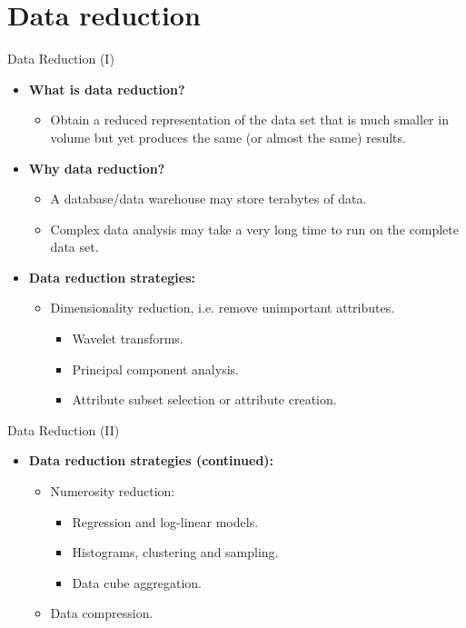 \section{Data reduction}

\begin{frame}{Data Reduction (I)}
	\begin{itemize}
		\item \textbf{What is data reduction?}\\
		      \begin{itemize}
			      \item Obtain a reduced representation of the data set that is much
			            smaller in volume but yet produces the same (or almost the same)
			            results.
		      \end{itemize}
		\item \textbf{Why data reduction?}\\
		      \begin{itemize}
			      \item A database/data warehouse may store terabytes of data.
			      \item Complex data analysis may take a very long time to run on the
			            complete data set.
		      \end{itemize}
		\item \textbf{Data reduction strategies:}
		      \begin{itemize}
			      \item Dimensionality reduction, i.e. remove unimportant attributes.
			            \begin{itemize}
				            \item Wavelet transforms.
				            \item Principal component analysis.
				            \item Attribute subset selection or attribute creation.
			            \end{itemize}
		      \end{itemize}
	\end{itemize}
\end{frame}

\begin{frame}{Data Reduction (II)}
	\begin{itemize}
		\item \textbf{Data reduction strategies (continued):}
		      \begin{itemize}
			      \item Numerosity reduction:
			            \begin{itemize}
				            \item Regression and log-linear models.
				            \item Histograms, clustering and sampling.
				            \item Data cube aggregation.
			            \end{itemize}
			      \item Data compression.
		      \end{itemize}
	\end{itemize}
\end{frame}

